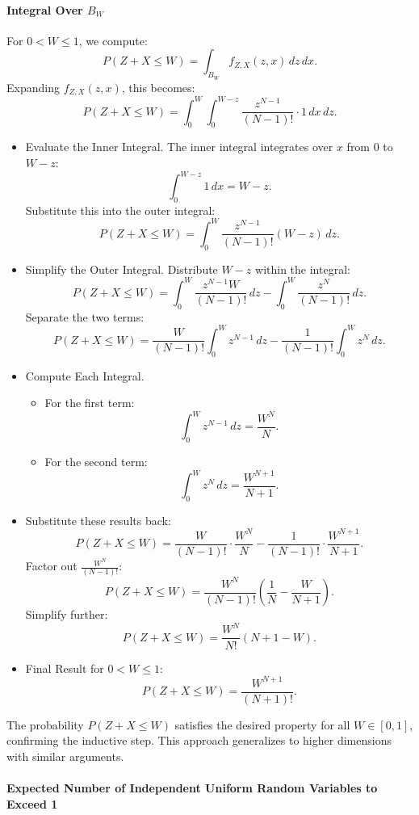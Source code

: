 \paragraph{Integral Over \( B_W \)}
For \( 0 < W \leq 1 \), we compute:
\[
P(Z + X \leq W) = \int_{B_W} f_{Z, X}(z, x) \, dz \, dx.
\]
Expanding \( f_{Z, X}(z, x) \), this becomes:
\[
P(Z + X \leq W) = \int_0^W \int_0^{W - z} \frac{z^{N-1}}{(N-1)!} \cdot 1 \, dx \, dz.
\]
\begin{itemize}
    \item Evaluate the Inner Integral. The inner integral integrates over \( x \) from 0 to \( W - z \):
\[
\int_0^{W-z} 1 \, dx = W - z.
\]
Substitute this into the outer integral:
\[
P(Z + X \leq W) = \int_0^W \frac{z^{N-1}}{(N-1)!} (W - z) \, dz.
\]
    \item  Simplify the Outer Integral. Distribute \( W - z \) within the integral:
\[
P(Z + X \leq W) = \int_0^W \frac{z^{N-1} W}{(N-1)!} \, dz - \int_0^W \frac{z^N}{(N-1)!} \, dz.
\]
Separate the two terms:
\[
P(Z + X \leq W) = \frac{W}{(N-1)!} \int_0^W z^{N-1} \, dz - \frac{1}{(N-1)!} \int_0^W z^N \, dz.
\]
    \item  Compute Each Integral.
    \begin{itemize}
        \item For the first term:
\[
\int_0^W z^{N-1} \, dz = \frac{W^N}{N}.
\]
        \item For the second term:
\[
\int_0^W z^N \, dz = \frac{W^{N+1}}{N+1}.
\]
    \end{itemize}

    \item  Substitute these results back:
\[
P(Z + X \leq W) = \frac{W}{(N-1)!} \cdot \frac{W^N}{N} - \frac{1}{(N-1)!} \cdot \frac{W^{N+1}}{N+1}.
\]
Factor out \( \frac{W^N}{(N-1)!} \):
\[
P(Z + X \leq W) = \frac{W^N}{(N-1)!} \left( \frac{1}{N} - \frac{W}{N+1} \right).
\]
Simplify further:
\[
P(Z + X \leq W) = \frac{W^N}{N!} \left( N + 1 - W \right).
\]
    \item Final Result for \( 0 < W \leq 1 \):
\[
P(Z + X \leq W) = \frac{W^{N+1}}{(N+1)!}.
\]

\end{itemize}
The probability \( P(Z + X \leq W) \) satisfies the desired property for all \( W \in [0, 1] \), confirming the inductive step. This approach generalizes to higher dimensions with similar arguments.

\paragraph{Expected Number of Independent Uniform Random Variables to Exceed 1}

